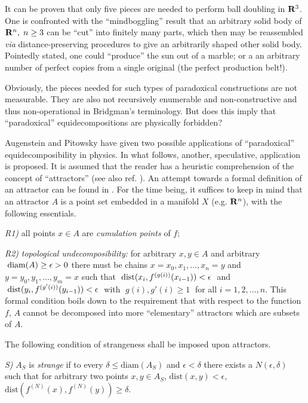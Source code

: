 It can be proven that only five pieces are needed to perform ball
doubling in ${\Bbb R}^3$.
One is confronted with the ``mindboggling'' result that an arbitrary
solid body of ${\Bbb R}^n,\; n\ge 3$ can be ``cut'' into finitely many
parts,
which then may be reassembled {\it via} distance-preserving procedures
to
give an arbitrarily shaped other solid body. Pointedly stated, one could
``produce'' the sun out of a marble; or a an arbitrary number of perfect
copies from a single original (the perfect production belt!).

Obviously, the pieces needed for such types of paradoxical constructions
are not measurable. They are also not recursively enumerable and
non-constructive and thus non-operational in Bridgman's terminology.
But does this imply that ``paradoxical''
equidecompositions are physically forbidden?


 Augenstein \cite{augenstein} and Pitowsky
\cite{pitowsky} have given two possible applications of ``paradoxical''
equidecomposibility in physics.
In what follows, another, speculative, application is proposed.
It is assumed that the reader has
 a heuristic comprehension of the concept of ``attractors'' (see also
 ref. \cite{shaw,schuster1}).
An attempt towards a formal definition of an attractor can be found in
\cite{eckmann1}.
For the time being, it suffices to keep in mind that an attractor $A$ is
a point set embedded in a manifold $X$ (e.g. ${\Bbb R}^n$), with the
following essentials.

{\it R1)}
all points $x\in A$ are {\em cumulation points} of $f$;

{\it R2)}
{\em topological undecomposibility:}
for arbitrary $x,y\in A$ and arbitrary $\; {\rm diam}(A)\ge \epsilon >0$
there must be
chains $x=x_0,x_1,\ldots ,x_n=y$ and $y=y_0,y_1,\ldots ,y_m=x$ such that
$\; {\rm dist}(x_i,f^{(g(i))}(x_{i-1}))<\epsilon \;$ and
$\;{\rm dist}(y_i,f^{(g'(i))}(y_{i-1}))<\epsilon \;$ with $\;g(i),
g'(i)\ge 1\;$ for all $i=1,2,\ldots ,n$.
This formal condition boils down to the requirement that with respect to
the function $f$, $A$ cannot be decomposed into more ``elementary''
attractors which are subsets of $A$.

The following condition of strangeness shall be imposed upon attractors.

{\it S)}
$A_S$ is {\em strange} if to every $\delta \le \mbox{diam} (A_S)$
and $\epsilon < \delta $ there exists a $N(\epsilon ,\delta )$ such that
for arbitrary two points $x,y\in A_S$, $\mbox{dist}(x,y)<\epsilon $,
$\mbox{dist} (f^{(N)}(x),f^{(N)}(y))\ge \delta $.

